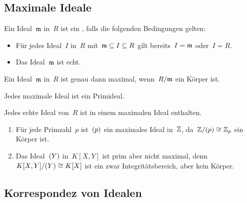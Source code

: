 \subsection{Maximale Ideale}

\begin{definition}
  Ein Ideal~$\mathfrak{m}$ in~$R$ ist ein , falls die folgenden Bedingungen gelten:
  \begin{itemize}
    \item
     Für jedes Ideal~$I$ in~$R$ mit~$\mathfrak{m} \subseteq I \subseteq R$ gilt bereits~$I = \mathfrak{m}$ oder~$I = R$.
    \item
      Das Ideal~$\mathfrak{m}$ ist echt.
  \end{itemize}
\end{definition}

\begin{proposition}
  Ein Ideal~$\mathfrak{m}$ in~$R$ ist genau dann maximal, wenn~$R/\mathfrak{m}$ ein Körper ist.
\end{proposition}

\begin{corollary}
  Jedes maximale Ideal ist ein Primideal.
\end{corollary}

\begin{proposition}
  Jedes echte Ideal von~$R$ ist in einem maximalen Ideal enthalten.
\end{proposition}

\begin{example}
  \leavevmode
  \begin{enumerate}
    \item
      Für jede Primzahl~$p$ ist~$(p)$ ein maximales Ideal in~$\mathbb{Z}$, da~$\mathbb{Z}/(p) \cong \mathbb{Z}_p$ ein Körper ist.
    \item
      Das Ideal~$(Y)$ in~$K[X,Y]$ ist prim aber nicht maximal, denn~$K[X,Y] / (Y) \cong K[X]$ ist ein zwar Integritätsbereich, aber kein Körper.
  \end{enumerate}
\end{example}


\subsection{Korrespondez von Idealen}

